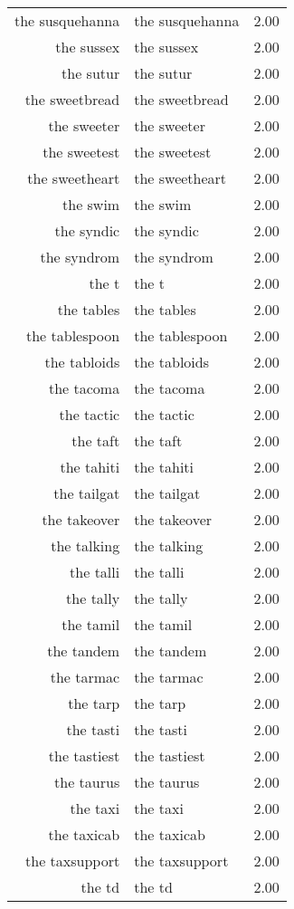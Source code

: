 \begin{table}[ht]
\begin{tabular}{rlr}
  the susquehanna & the susquehanna & 2.00 \\ 
  the sussex & the sussex & 2.00 \\ 
  the sutur & the sutur & 2.00 \\ 
  the sweetbread & the sweetbread & 2.00 \\ 
  the sweeter & the sweeter & 2.00 \\ 
  the sweetest & the sweetest & 2.00 \\ 
  the sweetheart & the sweetheart & 2.00 \\ 
  the swim & the swim & 2.00 \\ 
  the syndic & the syndic & 2.00 \\ 
  the syndrom & the syndrom & 2.00 \\ 
  the t & the t & 2.00 \\ 
  the tables & the tables & 2.00 \\ 
  the tablespoon & the tablespoon & 2.00 \\ 
  the tabloids & the tabloids & 2.00 \\ 
  the tacoma & the tacoma & 2.00 \\ 
  the tactic & the tactic & 2.00 \\ 
  the taft & the taft & 2.00 \\ 
  the tahiti & the tahiti & 2.00 \\ 
  the tailgat & the tailgat & 2.00 \\ 
  the takeover & the takeover & 2.00 \\ 
  the talking & the talking & 2.00 \\ 
  the talli & the talli & 2.00 \\ 
  the tally & the tally & 2.00 \\ 
  the tamil & the tamil & 2.00 \\ 
  the tandem & the tandem & 2.00 \\ 
  the tarmac & the tarmac & 2.00 \\ 
  the tarp & the tarp & 2.00 \\ 
  the tasti & the tasti & 2.00 \\ 
  the tastiest & the tastiest & 2.00 \\ 
  the taurus & the taurus & 2.00 \\ 
  the taxi & the taxi & 2.00 \\ 
  the taxicab & the taxicab & 2.00 \\ 
  the taxsupport & the taxsupport & 2.00 \\ 
  the td & the td & 2.00 \\ 

\end{tabular}
\end{table}

